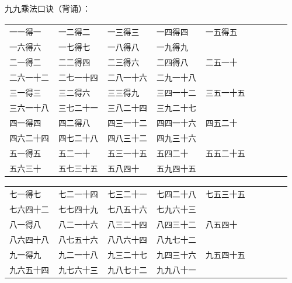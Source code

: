 \documentclass[12pt,UTF8]{ctexart}
\begin{document}
九九乘法口诀（背诵）：
\begin{center}
    \begin{tabular}{ p{5em} p{5em} p{5em} p{5em} p{5em} p{5em} p{5em} p{5em} p{5em}}
        \texttt{一一得一} & \texttt{一二得二} & \texttt{一三得三} & \texttt{一四得四} & \texttt{一五得五}\\
        \texttt{一六得六} & \texttt{一七得七} & \texttt{一八得八} & \texttt{一九得九} & \\
        \texttt{二一得二} & \texttt{二二得四} & \texttt{二三得六} & \texttt{二四得八} & \texttt{二五一十}\\
        \texttt{二六一十二} & \texttt{二七一十四} & \texttt{二八一十六} & \texttt{二九一十八} & \\
        \texttt{三一得三} & \texttt{三二得六} & \texttt{三三得九} & \texttt{三四一十二} & \texttt{三五一十五}\\
        \texttt{三六一十八} & \texttt{三七二十一} & \texttt{三八二十四} & \texttt{三九二十七} & \\
        \texttt{四一得四} & \texttt{四二得八} & \texttt{四三一十二} & \texttt{四四一十六} & \texttt{四五二十}\\
        \texttt{四六二十四} & \texttt{四七二十八} & \texttt{四八三十二} & \texttt{四九三十六} & \\
        \texttt{五一得五} & \texttt{五二一十} & \texttt{五三一十五} & \texttt{五四二十} & \texttt{五五二十五}\\
        \texttt{五六三十} & \texttt{五七三十五} & \texttt{五八四十} & \texttt{五九四十五} & \\
    \end{tabular}
\end{center}

\begin{center}
    \begin{tabular}{ p{5em} p{5em} p{5em} p{5em} p{5em} p{5em} p{5em} p{5em} p{5em}}
        \texttt{七一得七} & \texttt{七二一十四} & \texttt{七三二十一} & \texttt{七四二十八} & \texttt{七五三十五}\\
        \texttt{七六四十二} & \texttt{七七四十九} & \texttt{七八五十六} & \texttt{七九六十三} & \\
        \texttt{八一得八} & \texttt{八二一十六} & \texttt{八三二十四} & \texttt{八四三十二} & \texttt{八五四十}\\
        \texttt{八六四十八} & \texttt{八七五十六} & \texttt{八八六十四} & \texttt{八九七十二} & \\
        \texttt{九一得九} & \texttt{九二一十八} & \texttt{九三二十七} & \texttt{九四三十六} & \texttt{九五四十五}\\
        \texttt{九六五十四} & \texttt{九七六十三} & \texttt{九八七十二} & \texttt{九九八十一} & \\
    \end{tabular}
\end{center}
\end{document}
